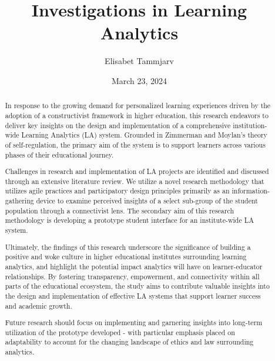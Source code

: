 \documentclass{l4proj}
\begin{document}
\title{Investigations in Learning Analytics}
\author{Elisabet Tammjarv}
\date{March 23, 2024}

\maketitle

\begin{abstract}

In response to the growing demand for personalized learning experiences driven by the adoption of a constructivist framework in higher education, this research endeavors to deliver key insights on the design and implementation of a comprehensive institution-wide Learning Analytics (LA) system. Grounded in Zimmerman and Moylan's theory of self-regulation, the primary aim of the system is to support learners across various phases of their educational journey.

Challenges in research and implementation of LA projects are identified and discussed through an extensive literature review. We utilize a novel research methodology that utilizes agile practices and participatory design principles primarily as an information-gathering device to examine perceived insights of a select sub-group of the student population through a connectivist lens. The secondary aim of this research methodology is developing a prototype student interface for an institute-wide LA system. 

Ultimately, the findings of this research underscore the significance of building a positive and woke culture in higher educational institutes surrounding learning analytics, and highlight the potential impact analytics will have on learner-educator relationships. By fostering transparency, empowerment, and connectivity within all parts of the educational ecosystem, the study aims to contribute valuable insights into the design and implementation of effective LA systems that support learner success and academic growth. 

Future research should focus on implementing and garnering insights into long-term utilization of the prototype developed - with particular emphasis placed on adaptability to account for the changing landscape of ethics and law surrounding analytics.
    

    
\end{abstract}
\end{document}
